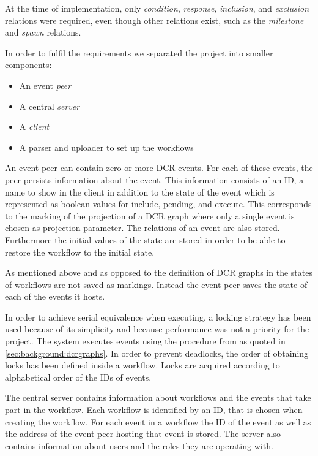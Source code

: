 		\newpar At the time of implementation, only \textit{condition}, \textit{response}, \textit{inclusion}, and \textit{exclusion} relations were required, even though other relations exist, such as the \textit{milestone} and \textit{spawn} relations. 
		
		\newpar In order to fulfil the requirements we separated the project into smaller components:
		
		\begin{itemize}
			\item An event \textit{peer}
			\item A central \textit{server}
			\item A \textit{client}
			\item A parser and uploader to set up the workflows
		\end{itemize}
		
		\newpar An event peer can contain zero or more DCR events. For each of these events, the peer persists information about the event. This information consists of an ID, a name to show in the client in addition to the state of the event which is represented as boolean values for include, pending, and execute. This corresponds to the marking of the projection of a DCR graph where only a single event is chosen as projection parameter. The relations of an event are also stored. Furthermore the initial values of the state are stored in order to be able to restore the workflow to the initial state.
		
		As mentioned above and as opposed to the definition of DCR graphs in \cite{hildebrandt2011declarative} the states of workflows are not saved as markings. Instead the event peer saves the state of each of the events it hosts.
		
		\newpar In order to achieve serial equivalence when executing, a locking strategy has been used because of its simplicity and because performance was not a priority for the project. The system executes events using the procedure from \cite{debois2015concurrency} as quoted in \autoref{sec:background:dcrgraphs}. In order to prevent deadlocks, the order of obtaining locks has been defined inside a workflow. Locks are acquired according to alphabetical order of the IDs of events.
		
		\newpar The central server contains information about workflows and the events that take part in the workflow. Each workflow is identified by an ID, that is chosen when creating the workflow. For each event in a workflow the ID of the event as well as the address of the event peer hosting that event is stored. The server also contains information about users and the roles they are operating with.
		
